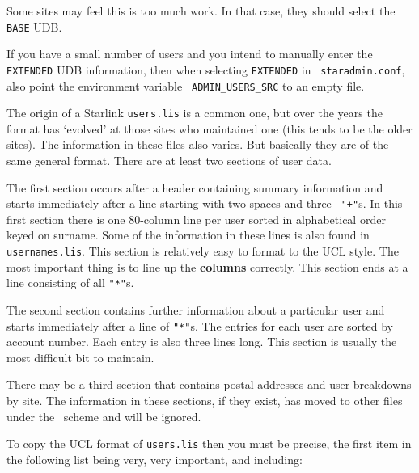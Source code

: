 Some sites may feel this is too much work. In that case, they should
select the {\tt BASE} UDB. 

If you have a small number of users and you intend to manually enter the
{\tt EXTENDED} UDB information, then when selecting {\tt EXTENDED} in {\tt
staradmin.conf}, also point the environment variable {\tt
ADMIN\_USERS\_SRC} to an empty file. 

The origin of a Starlink {\tt users.lis} is a common one, but over the
years the format has `evolved' at those sites who maintained one (this
tends to be the older sites). The information in these files also varies.
But basically they are of the same general format. There are at least two
sections of user data. 

The first section occurs after a header containing summary information and
starts immediately after a line starting with two spaces and three {\tt
"+"}s. In this first section there is one 80-column line per user sorted
in alphabetical order keyed on surname. Some of the information in these
lines is also found in {\tt usernames.lis}. This section is relatively
easy to format to the UCL style. The most important thing is to line up
the {\bf columns} correctly. This section ends at a line consisting of all
{\tt "*"}s. 

The second section contains further information about a particular user
and starts immediately after a line of {\tt "*"}s. The entries for each
user are sorted by account number. Each entry is also three lines long.
This section is usually the most difficult bit to maintain. 

There may be a third section that contains postal addresses and user
breakdowns by site. The information in these sections, if they exist, has
moved to other files under the \staradmin\ scheme and will be ignored. 

To copy the UCL format of {\tt users.lis} then you must be precise, the
first item in the following list being very, very important, and
including: 

